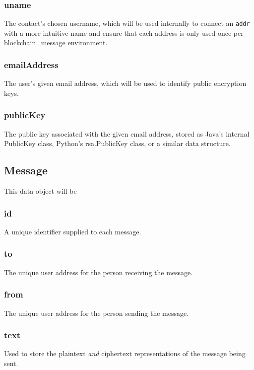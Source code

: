 \documentclass[titlepage]{report}
\begin{document}
\subsubsection{uname}
The contact's chosen username, which will be used internally to connect an \texttt{addr} with a more intuitive name and ensure that each address is only used once per blockchain\_message environment.

\subsubsection{emailAddress}
The user's given email address, which will be used to identify public encryption keys.

\subsubsection{publicKey}
The public key associated with the given email address, stored as Java's internal PublicKey class, Python's rsa.PublicKey class, or a similar data structure.

\subsection{Message}
This data object will be 

\subsubsection{id}
A unique identifier supplied to each message.

\subsubsection{to}
The unique user address for the person receiving the message.

\subsubsection{from}
The unique user address for the person sending the message.

\subsubsection{text}
Used to store the plaintext \textit{and} ciphertext representations of the message being sent.
\end{document}
